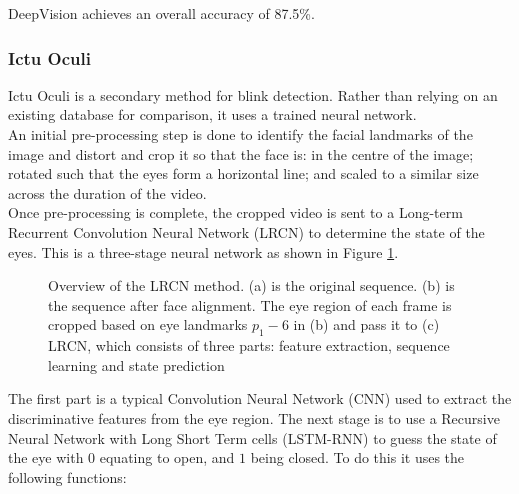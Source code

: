 \documentclass{article}
\begin{document}
DeepVision achieves an overall accuracy of 87.5\%\cite{blinking-pattern}.

\subsubsection{Ictu Oculi}

Ictu Oculi is a secondary method for blink detection. Rather than relying on an existing database for comparison, it uses a trained neural network\cite{ictuoculi}.\\

An initial pre-processing step is done to identify the facial landmarks of the image and distort and crop it so that the face is: in the centre of the image; rotated such that the eyes form a horizontal line; and scaled to a similar size across the duration of the video.\\

Once pre-processing is complete, the cropped video is sent to a Long-term Recurrent Convolution Neural Network (LRCN) to determine the state of the eyes. This is a three-stage neural network as shown in Figure \ref{fig:LRCN}. 

\begin{figure}[H]
    \centering
    \caption{Overview of the LRCN method. (a) is the original sequence. (b) is the sequence after face alignment. The eye region of each frame is cropped based on eye landmarks $p_1-6$ in (b) and pass it to (c) LRCN, which consists of three parts: feature extraction, sequence learning and state prediction\cite{ictuoculi}}
    \label{fig:LRCN}
\end{figure}

The first part is a typical Convolution Neural Network (CNN) used to extract the discriminative features from the eye region. The next stage is to use a Recursive Neural Network with Long Short Term cells (LSTM-RNN) to guess the state of the eye with $0$ equating to open, and $1$ being closed. To do this it uses the following functions:
\end{document}
